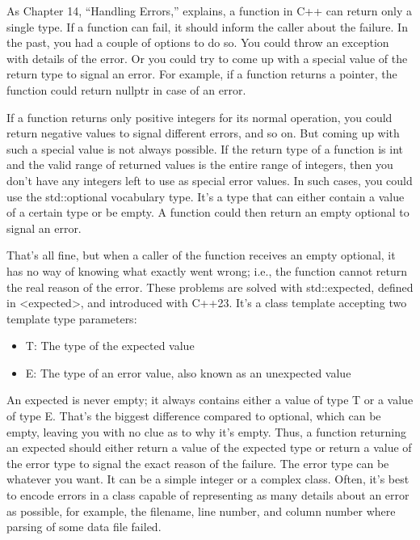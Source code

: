 
As Chapter 14, “Handling Errors,” explains, a function in C++ can return only a single type. If a function can fail, it should inform the caller about the failure. In the past, you had a couple of options to do so. You could throw an exception with details of the error. Or you could try to come up with a special value of the return type to signal an error.
For example, if a function returns a pointer, the function could return nullptr in case of an error.

If a function returns only positive integers for its normal operation, you could return negative values to signal different errors, and so on. But coming up with such a special value is not always possible. If the return type of a function is int and the valid range of returned values is the entire range of integers, then you don’t have any integers left to use as special error values. In such cases, you could use the std::optional vocabulary type. It’s a type that can either contain a value of a certain type or be empty. A function could then return an empty optional to signal an error.

That’s all fine, but when a caller of the function receives an empty optional, it has no way of knowing what exactly went wrong; i.e., the function cannot return the real reason of the error. These problems are solved with std::expected, defined in <expected>, and introduced with C++23. It’s a class template accepting two template type parameters:

\begin{itemize}
\item
T: The type of the expected value

\item
E: The type of an error value, also known as an unexpected value
\end{itemize}

An expected is never empty; it always contains either a value of type T or a value of type E. That’s the biggest difference compared to optional, which can be empty, leaving you with no clue as to why it’s empty. Thus, a function returning an expected should either return a value of the expected type or return a value of the error type to signal the exact reason of the failure. The error type can be whatever you want. It can be a simple integer or a complex class. Often, it’s best to encode errors in a class capable of representing as many details about an error as possible, for example, the filename, line number, and column number where parsing of some data file failed.

